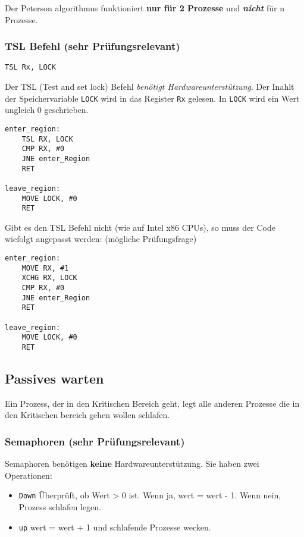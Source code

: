 Der Peterson algorithmus funktioniert \textbf{nur für 2 Prozesse} und
\textbf{\textit{nicht}} für n Prozesse.

\subsubsection{TSL Befehl (sehr Prüfungsrelevant)}

\lstinline{TSL Rx, LOCK}

Der TSL (Test and set lock) Befehl \textit{benötigt Hardwareunterstützung}. Der
Inahlt der Speichervariable \texttt{LOCK} wird in das Register \texttt{Rx}
gelesen. In \texttt{LOCK} wird ein Wert ungleich 0 geschrieben.

\begin{lstlisting}[language={[x86masm]Assembler}]
enter_region:
    TSL RX, LOCK
    CMP RX, #0
    JNE enter_Region
    RET
    
leave_region:
    MOVE LOCK, #0
    RET 
\end{lstlisting}

Gibt es den TSL Befehl nicht (wie auf Intel x86 CPUs), so muss der Code
wiefolgt angepasst werden: (mögliche Prüfungsfrage)

\begin{lstlisting}[language={[x86masm]Assembler}]
enter_region:
    MOVE RX, #1
    XCHG RX, LOCK
    CMP RX, #0
    JNE enter_Region
    RET
    
leave_region:
    MOVE LOCK, #0
    RET 
\end{lstlisting}

\subsection{Passives warten}

Ein Prozess, der in den Kritischen Bereich geht, legt alle anderen Prozesse die
in den Kritischen bereich gehen wollen schlafen.

\subsubsection{Semaphoren (sehr Prüfungsrelevant)}

Semaphoren benötigen \textbf{keine} Hardwareunterstützung. Sie haben zwei
Operationen:

\begin{itemize}
    \item \texttt{Down} \newline Überprüft, ob Wert > 0 ist. Wenn ja, wert = wert - 1. Wenn nein, Prozess schlafen legen.
    \item \texttt{up} \newline wert = wert + 1 und schlafende Prozesse wecken.
\end{itemize}

